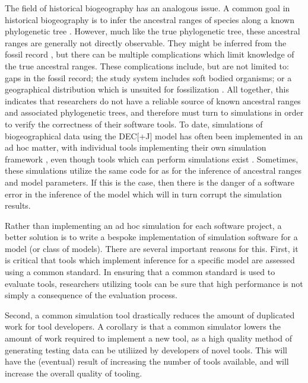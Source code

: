 \documentclass[a4paper]{article}
\begin{document}
The field of historical biogeography has an analogous issue.
A common goal in historical biogeography is to infer the ancestral ranges of species along a known phylogenetic tree
\citep{varela_phylogeny_2019, baker_global_2013, vicente_and_2017}.
However, much like the true phylogenetic tree, these ancestral ranges are generally not directly observable.
They might be inferred from the fossil record \cite{mclachlan_reconstructing_2004}, but there can be multiple
complications which limit knowledge of the true ancestral ranges.
These complications include, but are not limited to: gaps in the fossil record; the study system includes soft bodied
organisms; or a geographical distribution which is unsuited for fossilization \cite{kidwell_quality_2002}.
All together, this indicates that researchers do not have a reliable source of known ancestral ranges and associated
phylogenetic trees, and therefore must turn to simulations in order to verify the correctness of their software tools.
To date, simulations of biogeographical data using the DEC[+J] model has often been implemented in an ad hoc matter,
with individual tools implementing their own simulation framework \cite{matzke_statistical_2022,
bettisworth_lagrange-ng_2023}, even though tools which can perform simulations exist \cite{hohna_revbayes_2016}.
Sometimes, these simulations utilize the same code for as for the inference of ancestral ranges and model parameters.
If this is the case, then there is the danger of a software error in the inference of the model which will in turn
corrupt the simulation results.

Rather than implementing an ad hoc simulation for each software project, a better solution is to write a bespoke
implementation of simulation software for a model (or class of models).
There are several important reasons for this.
First, it is critical that tools which implement inference for a specific model are assessed using a common standard.
In ensuring that a common standard is used to evaluate tools, researchers utilizing tools can be sure that high
performance is not simply a consequence of the evaluation process.

Second, a common simulation tool drastically reduces the amount of duplicated work for tool developers.
A corollary is that a common simulator lowers the amount of work required to implement a new tool, as a high
quality method of generating testing data can be utiliized by developers of novel tools.
This will have the (eventual) result of increasing the number of tools available, and will increase the overall quality
of tooling.
\end{document}
